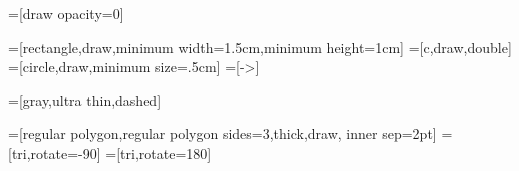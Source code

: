 \usetikzlibrary{calc}

\usetikzlibrary{shapes.geometric}

=[draw opacity=0]

=[rectangle,draw,minimum width=1.5cm,minimum height=1cm]
=[c,draw,double]
=[circle,draw,minimum size=.5cm]
=[->]

=[gray,ultra thin,dashed]

=[regular polygon,regular polygon sides=3,thick,draw,
inner sep=2pt]
=[tri,rotate=-90]
=[tri,rotate=180]

